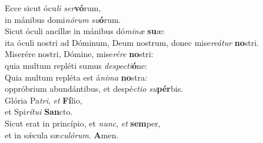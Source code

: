 \evenverse Ecce sicut ócu\textit{li} \textit{ser}\textbf{vó}rum,~\*\\
\evenverse in mánibus domi\textit{nó}\textit{rum} \textit{su}\textbf{ó}rum.\\
\oddverse Sicut óculi ancíllæ in mánibus dó\textit{mi}\textit{næ} \textbf{su}æ:~\*\\
\oddverse ita óculi nostri ad Dóminum, Deum nostrum, donec mise\textit{re}\textit{á}\textit{tur} \textbf{no}stri.\\
\evenverse Miserére nostri, Dómine, mise\textit{ré}\textit{re} \textbf{no}stri:~\*\\
\evenverse quia multum repléti sumus \textit{de}\textit{spe}\textit{cti}\textbf{ó}ne:\\
\oddverse Quia multum repléta est á\textit{ni}\textit{ma} \textbf{no}stra:~\*\\
\oddverse oppróbrium abundántibus, et despé\textit{cti}\textit{o} \textit{su}\textbf{pér}bis.\\
\evenverse Glória Pa\textit{tri}, \textit{et} \textbf{Fí}lio,~\*\\
\evenverse et Spi\textit{rí}\textit{tu}\textit{i} \textbf{San}cto.\\
\oddverse Sicut erat in princípio, et \textit{nunc}, \textit{et} \textbf{sem}per,~\*\\
\oddverse et in sǽcula sæ\textit{cu}\textit{ló}\textit{rum}. \textbf{A}men.\\
